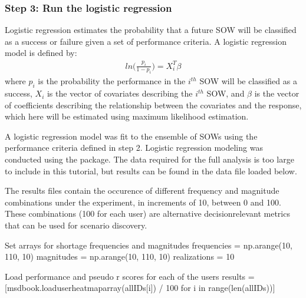 \documentclass[letterpaper,10pt,english]{book}
\begin{document}
\subsubsection{Step 3: Run the logistic regression}
\label{\detokenize{A2_Jupyter_Notebooks:step-3-run-the-logistic-regression}}
\sphinxAtStartPar
Logistic regression estimates the probability that a future SOW will be
classified as a success or failure given a set of performance criteria.
A logistic regression model is defined by:
\begin{equation*}
\begin{split}ln \bigg (\frac{p_i}{1-p_i} \bigg ) = X^T_i \beta\end{split}
\end{equation*}
\sphinxAtStartPar
where \(p_i\) is the probability the performance in the
\(i^{th}\) SOW will be classified as a success, \(X_i\) is the
vector of covariates describing the \(i^{th}\) SOW, and
\(\beta\) is the vector of coefficients describing the relationship
between the covariates and the response, which here will be estimated
using maximum likelihood estimation.

\sphinxAtStartPar
A logistic regression model was fit to the ensemble of SOWs using the
performance criteria defined in step 2. Logistic regression modeling was
conducted using the  package. The
data required for the full analysis is too large to include in this
tutorial, but results can be found in the data file loaded below.

\sphinxAtStartPar
The results files contain the occurence of different frequency and
magnitude combinations under the experiment, in increments of 10,
between 0 and 100. These combinations (100 for each user) are
alternative decision\sphinxhyphen{}relevant metrics that can be used for scenario
discovery.

\begin{sphinxVerbatim}[commandchars=\\\{\}]
\PYGZsh{} Set arrays for shortage frequencies and magnitudes
frequencies = np.arange(10, 110, 10)
magnitudes = np.arange(10, 110, 10)
realizations = 10


\PYGZsh{} Load performance and pseudo r scores for each of the users
results = [msdbook.load\PYGZus{}user\PYGZus{}heatmap\PYGZus{}array(all\PYGZus{}IDs[i]) / 100 for i in range(len(all\PYGZus{}IDs))]
\end{sphinxVerbatim}
\end{document}
